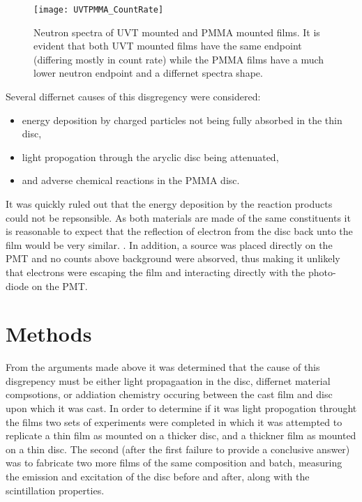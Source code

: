 \documentclass[draftcls,onecolumn]{IEEEtran}
\begin{document}
\begin{figure}
  \centering
  \texttt{[image: UVTPMMA\_CountRate]}
  \caption[Neutron Spectra of UVT mounted and PMMA mounted films]{Neutron spectra of UVT mounted and PMMA mounted films.  It is evident that both UVT mounted films have the same endpoint (differing mostly in count rate) while the PMMA films have a much lower neutron endpoint and a differnet spectra shape.}
  \label{fig:NeutronCountRateRepeat}
\end{figure}
Several differnet causes of this disgregency were considered:
\begin{itemize}
  \item energy deposition by charged particles not being fully absorbed in the thin disc,
  \item light propogation through the aryclic disc being attenuated,
  \item and adverse chemical reactions in the PMMA disc.
\end{itemize}

It was quickly ruled out that the energy deposition by the reaction products could not be repsonsible.
As both materials are made of the same constituents it is reasonable to expect that the reflection of electron from the disc back unto the film would be very similar.
.
In addition, a  source was placed directly on the PMT and no counts above background were absorved, thus making it unlikely that electrons were escaping the film and interacting directly with the photo-diode on the PMT.

\section{Methods}
From the arguments made above it was determined that the cause of this disgrepency must be either light propagaation in the disc, differnet material compsotions, or addiation chemistry occuring between the cast film and disc upon which it was cast.
In order to determine if it was light propogation throught the films two sets of experiments were completed in which it was attempted to replicate a thin film as mounted on a thicker disc, and a thickner film as mounted on a thin disc.
The second (after the first failure to provide a conclusive answer) was to fabricate two more films of the same composition and batch, measuring the emission and excitation of the disc before and after, along with the scintillation properties.
\end{document}
